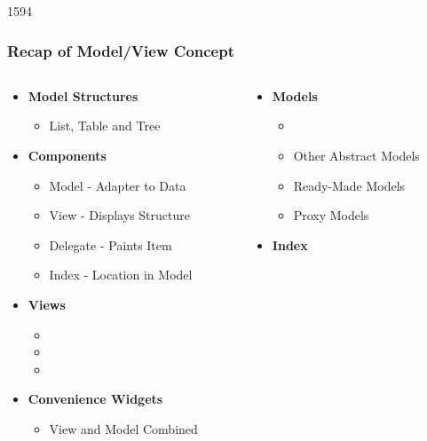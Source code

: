 \begin{slide}{1594}\frametitle{Recap of Model/View Concept}
\begin{columns}
  \begin{column}{50mm}
    \begin{itemize}
    \item \textbf{Model Structures}
      \begin{itemize}
      \item List, Table and Tree
      \end{itemize}
    \item \textbf{Components}
      \begin{itemize}
      \item Model - Adapter to Data
      \item View - Displays Structure
      \item Delegate - Paints Item
      \item Index - Location in Model
      \end{itemize}
    \item \textbf{Views}
      \begin{itemize}
      \item {}
      \item {}
      \item {}
      \end{itemize}
    \item \textbf{Convenience Widgets}
      \begin{itemize}
      \item View and Model Combined
      \end{itemize}
    \end{itemize}
  \end{column}
  \begin{column}{55mm}
    \begin{itemize}
    \item \textbf{Models}
      \begin{itemize}
      \item {}
      \item Other Abstract Models
      \item Ready-Made Models
      \item Proxy Models
      \end{itemize}
    \item \textbf{Index}
      \begin{itemize}

\end{itemize}
\end{itemize}
\end{column}
\end{columns}
\end{slide}

